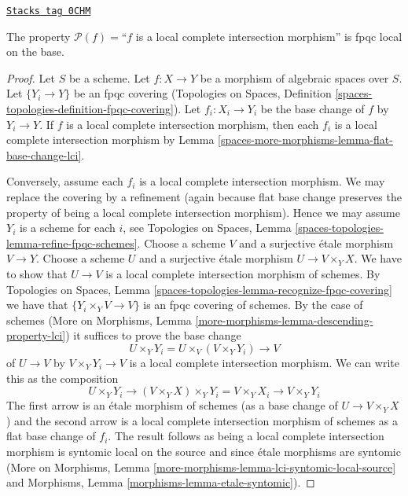 \begin{lemma}
\label{spaces-more-morphisms-lemma-descending-property-lci}
\href{https://stacks.math.columbia.edu/tag/0CHM}{\texttt{Stacks tag 0CHM}}

The property $\mathcal{P}(f) =$``$f$ is a local complete intersection
morphism'' is fpqc local on the base.
\end{lemma}

\begin{proof}
Let $S$ be a scheme. Let $f : X \to Y$ be a
morphism of algebraic spaces over $S$.
Let $\{Y_i \to Y\}$ be an fpqc covering
(Topologies on Spaces, Definition
\ref{spaces-topologies-definition-fpqc-covering}).
Let $f_i : X_i \to Y_i$ be the base change of $f$ by $Y_i \to Y$.
If $f$ is a local complete intersection morphism,
then each $f_i$ is a local complete intersection morphism
by Lemma \ref{spaces-more-morphisms-lemma-flat-base-change-lci}.

\medskip\noindent
Conversely, assume each $f_i$ is a local complete intersection morphism.
We may replace the covering by a refinement (again because
flat base change preserves the property of being a
local complete intersection morphism). Hence we may assume
$Y_i$ is a scheme for each $i$, see
Topologies on Spaces, Lemma \ref{spaces-topologies-lemma-refine-fpqc-schemes}.
Choose a scheme $V$ and a surjective \'etale morphism $V \to Y$.
Choose a scheme $U$ and a surjective \'etale morphism
$U \to V \times_Y X$. We have to show that $U \to V$ is a
local complete intersection morphism of schemes.
By Topologies on Spaces, Lemma
\ref{spaces-topologies-lemma-recognize-fpqc-covering}
we have that $\{Y_i \times_Y V \to V\}$ is an fpqc covering
of schemes. By the case of schemes
(More on Morphisms, Lemma \ref{more-morphisms-lemma-descending-property-lci})
it suffices to prove the base change
$$
U \times_Y Y_i = U \times_V (V \times_Y Y_i) \longrightarrow V
$$
of $U \to V$ by $V \times_Y Y_i \to V$ is a
local complete intersection morphism. We can write this as the
composition
$$
U \times_Y Y_i \longrightarrow
(V \times_Y X) \times_Y Y_i = V \times_Y X_i \longrightarrow
V \times_Y Y_i
$$
The first arrow is an \'etale morphism of schemes (as a base change of
$U \to V \times_Y X$) and the second arrow is a
local complete intersection morphism of schemes as a flat base change of $f_i$.
The result follows as being a local complete intersection morphism
is syntomic local on the source and since \'etale morphisms
are syntomic (More on Morphisms, Lemma
\ref{more-morphisms-lemma-lci-syntomic-local-source}
and Morphisms, Lemma \ref{morphisms-lemma-etale-syntomic}).
\end{proof}

